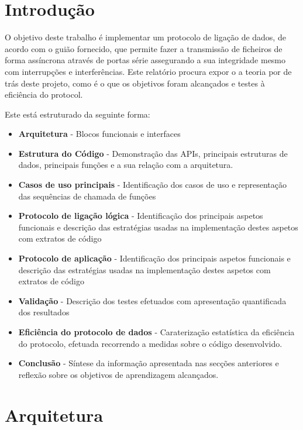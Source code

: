 \documentclass[a4paper,11pt,portuguese]{article}
\begin{document}
\section{Introdução}
    \par O objetivo deste trabalho é implementar um protocolo de ligação de dados, 
    de acordo com o guião fornecido, que permite fazer a transmissão de ficheiros 
    de forma assíncrona através de portas série assegurando a sua integridade
    mesmo com interrupções e interferências. Este relatório procura expor o a
    teoria por de trás deste projeto, como é o que os objetivos foram alcançados
    e testes à eficiência do protocol. 
    \par Este está estruturado da seguinte forma:
    \begin{itemize}
        \item \textbf{Arquitetura} - Blocos funcionais e interfaces
        \item \textbf{Estrutura do Código} - Demonstração das APIs, principais 
        estruturas de dados, principais funções e a sua relação com a arquitetura.
        \item \textbf{Casos de uso principais} - Identificação dos casos de uso 
        e representação das sequências de chamada de funções
        \item \textbf{Protocolo de ligação lógica} - Identificação dos principais
        aspetos funcionais e descrição das estratégias usadas na implementação destes
        aspetos com extratos de código
        \item \textbf{Protocolo de aplicação} - Identificação dos principais
        aspetos funcionais e descrição das estratégias usadas na implementação destes
        aspetos com extratos de código
        \item \textbf{Validação} - Descrição dos testes efetuados com apresentação
        quantificada dos resultados
        \item \textbf{Eficiência do protocolo de dados} - Caraterização estatística 
        da eficiência do protocolo, efetuada recorrendo a medidas sobre o código desenvolvido.
        \item \textbf{Conclusão} - Síntese da informação apresentada nas secções
        anteriores e reflexão sobre os objetivos de aprendizagem alcançados.
    \end{itemize}


\section{Arquitetura}
\end{document}
